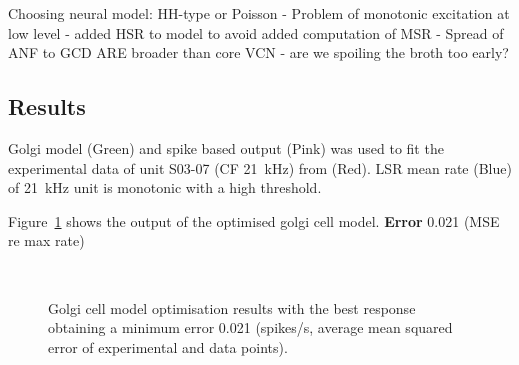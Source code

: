 Choosing neural model: HH-type or Poisson
 - Problem of monotonic excitation at low level
  - added HSR to model to avoid added computation of MSR
 - Spread of ANF to GCD ARE broader than core VCN
  - are we spoiling the broth too early? 



\newpage






\clearpage
\subsection{Results}

Golgi model (Green) and spike based output (Pink) was used to
fit the experimental data of unit S03-07 (CF 21~kHz) from
\citep{GhoshalKim:1996} (Red).  LSR mean rate (Blue) of 21~kHz unit is
monotonic with a high threshold.

Figure~\ref{fig:GolgiResult} shows the output of the optimised golgi cell model.
\textbf{Error} 0.021 (MSE re max rate)


\begin{figure}[htb]
  \centering %
   \\
  \caption{Golgi cell model optimisation results with the best response obtaining a minimum error 0.021 (spikes/s, average mean squared error of experimental and data points). }\label{fig:GolgiResult}
\end{figure}


